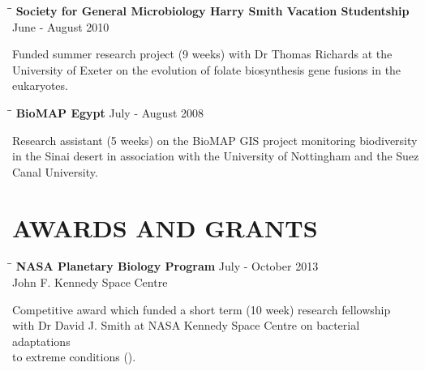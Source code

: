 \documentclass{res}
\begin{document}
\begin{resume}
   \vspace{-0.1in}
      \begin{tabbing}
   \hspace{2in}\= \hspace{2.6in}\= \kill 
    {\bf Society for General Microbiology Harry Smith Vacation Studentship} \> \>        June - August 2010\\
     \end{tabbing}\vspace{-20pt}      
     Funded summer research project (9 weeks) with Dr Thomas Richards at the University of Exeter on the evolution of folate biosynthesis gene fusions in the eukaryotes.

\vspace{-0.1in}
   \begin{tabbing}
   \hspace{2in}\= \hspace{2.6in}\= \kill 
    {\bf BioMAP Egypt} \> \>        July - August 2008\\
     \end{tabbing}\vspace{-20pt}      
     Research assistant (5 weeks) on the BioMAP GIS project monitoring biodiversity in the Sinai desert in association with the University of Nottingham and the Suez Canal University.

\section{AWARDS AND GRANTS}

   \vspace{-0.05in}  

  \begin{tabbing}
   \hspace{2in}\= \hspace{2.6in}\= \kill 
    {\bf NASA Planetary Biology Program} \> \>July - October 2013\\
                            \> 
                            \> John F. Kennedy Space Centre\\

   \end{tabbing}\vspace{-30pt}     
   Competitive award which funded a short term (10 week) research fellowship \\ with Dr David J. Smith at NASA Kennedy Space Centre on bacterial adaptations \\ to extreme conditions ().


\end{resume}
\end{document}
